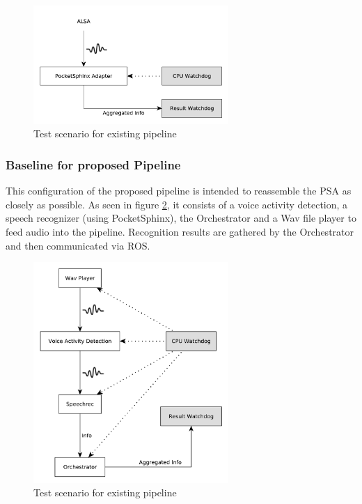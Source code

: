 \begin{figure}[]
	\centering
	\includegraphics[width=0.66\textwidth]{diagrams/eval_pipeline_1.pdf}
	\caption{Test scenario for existing pipeline}
	\label{pic:eval_p1_diag}
\end{figure}

\subsubsection{Baseline for proposed Pipeline}
This configuration of the proposed pipeline is intended to reassemble the PSA as closely as possible.
As seen in figure \ref{pic:eval_p2_diag}, it consists of a voice activity detection, a speech recognizer (using PocketSphinx), the Orchestrator and a Wav file player to feed audio into the pipeline.
Recognition results are gathered by the Orchestrator and then communicated via ROS.

\begin{figure}[]
	\centering
	\includegraphics[width=0.66\textwidth]{diagrams/eval_pipeline_2.pdf}
	\caption{Test scenario for existing pipeline}
	\label{pic:eval_p2_diag}
\end{figure}


